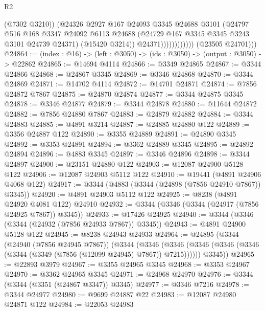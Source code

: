 \begin{lexlean}{R2}
\begin{coremodule}
                                (@7302 @3210))
                              (@24326
                                @2927
                                @167
                                @24093
                                @3345
                                @24688
                                @3101
                                (@24797
                                  @516
                                  @168
                                  @3347
                                  @24092
                                  @6113
                                  @24688
                                  (@24729 @167 @3345 @3345 @3243 @3101 @24739 @24371)
                                  (@15420 @3214))
                                @24371))))))))))))
        (@23505 @24701)))
@24864 := (index : @16) -> (left : @3050) -> (ids : @3050) -> (output : @3050) -> @22862
@24865 := @14694 @4114
@24866 := @3349 @24865
@24867 := @3344 @24866
@24868 := @24867 @3345
@24869 := @3346 @24868
@24870 := @3344 @24869
@24871 := @14702 @4114
@24872 := @14701 @24871
@24874 := @7856 @24872 @7867
@24875 := @24870 @24874
@24877 := @3344 @24875 @3345
@24878 := @3346 @24877
@24879 := @3344 @24878
@24880 := @11644 @24872
@24882 := @7856 @24880 @7867
@24883 := @24879 @24882
@24884 := @3344 @24883
@24885 := @4891 @3214
@24887 := @24885 @24880 @122
@24889 := @3356 @24887 @122
@24890 := @3355 @24889
@24891 := @24890 @3345
@24892 := @3353 @24891
@24894 := @3362 @24889 @3345
@24895 := @24892 @24894
@24896 := @4883 @3345
@24897 := @3346 @24896
@24898 := @3344 @24897
@24900 := @23151 @24880 @122
@24903 := @12087 @24900 @5128 @122
@24906 := @12087 @24903 @5112 @122
@24910 := @19441 (@4891 @24906 @4068 @122)
@24917 := @3344 (@4883 (@3344 (@24898 (@7856 @24910 @7867)) @3345))
@24920 := @4891 @24903 @5112 @122
@24925 := @8238 (@4891 @24920 @4081 @122) @24910
@24932 := @3344 (@3346 (@3344 (@24917 (@7856 @24925 @7867)) @3345))
@24933 := @17426 @24925
@24940 := @3344 (@3346 (@3344 (@24932 (@7856 @24933 @7867)) @3345))
@24943 := @4891 @24900 @5128 @122
@24945 := @8238 @24943 @24933
@24964 := @24895
    (@3344
      (@24940 (@7856 @24945 @7867))
      (@3344
        (@3346 (@3346 (@3346 (@3346 (@3346 (@3344 (@3349 (@7856 (@12099 @24945) @7867)) @7215))))))
        @3345))
@24965 := @22893 @3979
@24967 := @3355 @24965 @3345
@24968 := @3353 @24967
@24970 := @3362 @24965 @3345
@24971 := @24968 @24970
@24976 := @3344 (@3344 (@3351 (@24867 @3347)) @3345)
@24977 := @3346 @7216
@24978 := @3344 @24977
@24980 := @9699 @24887 @22
@24983 := @12087 @24980 @24871 @122
@24984 := @22053 @24983

\end{coremodule}
\end{lexlean}
